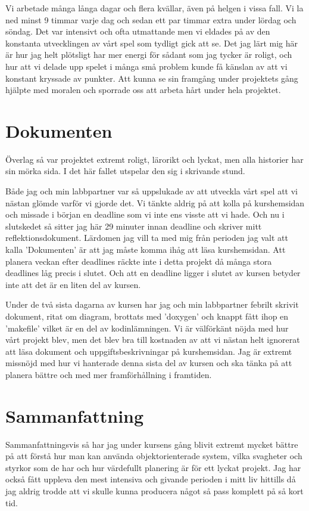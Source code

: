 \documentclass{TDP005mall}
\begin{document}
Vi arbetade många långa dagar och flera kvällar, även på helgen i vissa fall. Vi la ned minst 9 timmar varje dag och sedan ett par timmar extra under lördag och söndag. Det var intensivt och ofta utmattande men vi eldades på av den konstanta utvecklingen av vårt spel som tydligt gick att se. Det jag lärt mig här är hur jag helt plötsligt har mer energi för sådant som jag tycker är roligt, och hur att vi delade upp spelet i många små problem kunde få känslan av att vi konstant kryssade av punkter. Att kunna se sin framgång under projektets gång hjälpte med moralen och sporrade oss att arbeta hårt under hela projektet.


\section{Dokumenten}
Överlag så var projektet extremt roligt, lärorikt och lyckat, men alla historier har sin mörka sida. I det här fallet utspelar den sig i skrivande stund.

Både jag och min labbpartner var så uppslukade av att utveckla vårt spel att vi nästan glömde varför vi gjorde det. Vi tänkte aldrig på att kolla på kurshemsidan och missade i början en deadline som vi inte ens visste att vi hade. Och nu i slutskedet så sitter jag här 29 minuter innan deadline och skriver mitt reflektionsdokument. Lärdomen jag vill ta med mig från perioden jag valt att kalla 'Dokumenten' är att jag måste komma ihåg att läsa kurshemsidan. Att planera veckan efter deadlines räckte inte i detta projekt då många stora deadlines låg precis i slutet. Och att en deadline ligger i slutet av kursen betyder inte att det är en liten del av kursen.

Under de två sista dagarna av kursen har jag och min labbpartner febrilt skrivit dokument, ritat om diagram, brottats med 'doxygen' och knappt fått ihop en 'makefile' vilket är en del av kodinlämningen. Vi är välförkänt nöjda med hur vårt projekt blev, men det blev bra till kostnaden av att vi nästan helt ignorerat att läsa dokument och uppgiftsbeskrivningar på kurshemsidan. Jag är extremt missnöjd med hur vi hanterade denna sista del av kursen och ska tänka på att planera bättre och med mer framförhållning i framtiden.

\section{Sammanfattning}
Sammanfattningsvis så har jag under kursens gång blivit extremt mycket bättre på att förstå hur man kan använda objektorienterade system, vilka svagheter och styrkor som de har och hur värdefullt planering är för ett lyckat projekt. Jag har också fått uppleva den mest intensiva och givande perioden i mitt liv hittills då jag aldrig trodde att vi skulle kunna producera något så pass komplett på så kort tid.
\end{document}
